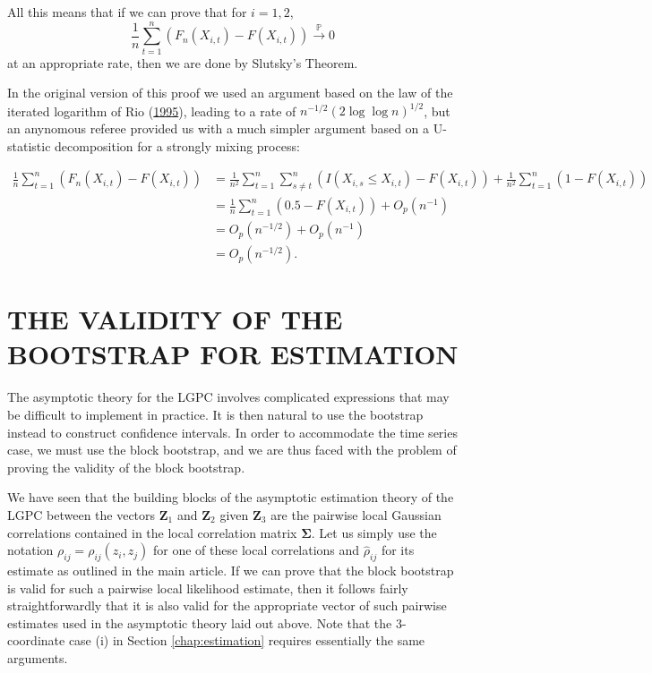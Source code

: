 \documentclass[
  12pt,
  letterpaper]{article}
\numberwithin{equation}{section}
\newcommand{\Z}{\bm{Z}}
\newcommand{\hrho}{\widehat{\rho}}
\newcommand{\fSigma}{\bm{\Sigma}}
\begin{document}
All this means that if we can prove that for \(i=1,2\),
\[\frac{1}{n}\sum_{t=1}^n(F_n(X_{i,t}) - F(X_{i,t})) \stackrel{\mathbb{P}}{\rightarrow} 0\]
at an appropriate rate, then we are done by Slutsky's Theorem.

In the original version of this proof we used an argument based on the law of the iterated logarithm of Rio (\protect\hyperlink{ref-rio1995functional}{1995}), leading to a rate of \(n^{-1/2}(2 \log \log n )^{1/2}\), but an anynomous referee provided us with a much simpler argument based on a U-statistic decomposition for a strongly mixing process:

\begin{align*}
\frac{1}{n}\sum_{t=1}^n \left(F_n(X_{i,t}) - F(X_{i,t})\right) &= 
\frac{1}{n^2}\sum_{t=1}^n\sum_{s \neq t}^n \left(I(X_{i,s} \leq X_{i,t}) - F(X_{i,t})\right) + \frac{1}{n^2}\sum_{t=1}^n \left(1 - F(X_{i,t})\right) \\
&= \frac{1}{n} \sum_{t=1}^n \left(0.5 - F(X_{i,t})\right) + O_p\left(n^{-1}\right) \\
&= O_p\left(n^{-1/2}\right) + O_p\left(n^{-1}\right) \\
&= O_p\left(n^{-1/2}\right).
\end{align*}

\hypertarget{validity-bootstrap}{%
\section{THE VALIDITY OF THE BOOTSTRAP FOR ESTIMATION}\label{validity-bootstrap}}

The asymptotic theory for the LGPC involves complicated expressions that may be difficult to implement in practice. It is then natural to use the bootstrap instead to construct confidence intervals. In order to accommodate the time series case, we must use the block bootstrap, and we are thus faced with the problem of proving the validity of the block bootstrap.

We have seen that the building blocks of the asymptotic estimation theory of the LGPC between the vectors \(\Z_1\) and \(\Z_2\) given \(\Z_3\) are the pairwise local Gaussian correlations contained in the local correlation matrix \(\fSigma\). Let us simply use the notation \(\rho_{ij} = \rho_{ij}(z_i, z_j)\) for one of these local correlations and \(\hrho_{ij}\) for its estimate as outlined in the main article. If we can prove that the block bootstrap is valid for such a pairwise local likelihood estimate, then it follows fairly straightforwardly that it is also valid for the appropriate vector of such pairwise estimates used in the asymptotic theory laid out above. Note that the 3-coordinate case (i) in Section \ref{chap:estimation} requires essentially the same arguments.
\end{document}
